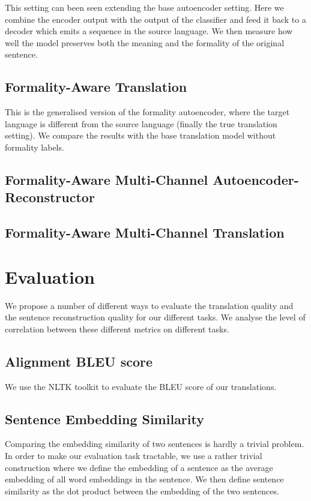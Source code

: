 \documentclass[11pt]{article}
\begin{document}
This setting can been seen extending the base autoencoder setting. Here we combine the encoder output with the output of the classifier and feed it back to a decoder which emits a sequence in the source language. We then measure how well the model preserves both the meaning and the formality of the original sentence.

\subsection{Formality-Aware Translation}

This is the generalised version of the formality autoencoder, where the target language is different from the source language (finally the true translation setting). We compare the results with the base translation model without formality labels.

\subsection{Formality-Aware Multi-Channel Autoencoder-Reconstructor}

\subsection{Formality-Aware Multi-Channel Translation}

\section{Evaluation}

We propose a number of different ways to evaluate the translation quality and the sentence reconstruction quality for our different tasks. We analyse the level of correlation between these different metrics on different tasks.

\subsection{Alignment BLEU score}

We use the NLTK toolkit \cite{NLTK} to evaluate the BLEU score of our translations.

\subsection{Sentence Embedding Similarity}

Comparing the embedding similarity of two sentences is hardly a trivial problem. In order to make our evaluation task tractable, we use a rather trivial construction where we define the embedding of a sentence as the average embedding of all word embeddings in the sentence. We then define sentence similarity as the dot product between the embedding of the two sentences. 

\newpage
\printbibliography
\end{document}
